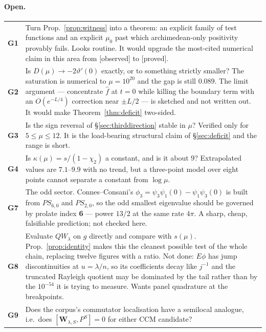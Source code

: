 \documentclass[11pt,a4paper]{article}
\theoremstyle{plain}
\theoremstyle{definition}
\theoremstyle{remark}
\newcommand{\st}[1]{{\normalfont\sffamily\footnotesize[#1]}}
\newcommand{\proved}{\st{proved}}
\newcommand{\observed}{\st{observed}}
\newcommand{\R}{\mathbb{R}}
\newcommand{\Z}{\mathbb{Z}}
\newcommand{\Q}{\mathbb{Q}}
\newcommand{\A}{\mathbb{A}}
\newcommand{\E}{\mathcal{E}}
\newcommand{\F}{\mathcal{F}}
\newcommand{\PS}{\mathit{PS}}
\newcommand{\QW}{QW}
\def\QW{QW}\def\E{E}\def\F{F}\def\R{R}\def\Q{Q}\def\Z{Z}\def\A{A}%
\begin{document}
\paragraph{Open.}

\begin{center}\small
\begin{tabular}{@{}lp{}@{}}
\hline
\textbf{G1} & Turn Prop.~\ref{prop:witness} into a theorem: an explicit family of
test functions and an explicit $\mu_0$ past which archimedean-only positivity
provably fails.  Looks routine.  It would upgrade the most-cited numerical claim
in this area from \observed{} to \proved. \\
\textbf{G2} & Is $D(\mu)\to-2\vartheta'(0)$ exactly, or to something strictly
smaller?  The saturation is numerical to $\mu=10^{20}$ and the gap is still
$0.089$.  The limit argument --- concentrate $\widehat f$ at $t=0$ while killing
the boundary term with an $O(e^{-L/4})$ correction near $\pm L/2$ --- is sketched
and not written out.  It would make Theorem~\ref{thm:deficit} two-sided. \\
\textbf{G3} & Is the sign reversal of \S\ref{sec:thirddirection} stable in $\mu$?
Verified only for $5\le\mu\le12$.  It is the load-bearing structural claim of
\S\ref{sec:deficit} and the range is short. \\
\textbf{G4} & Is $\kappa(\mu)=s/(1-\chi_2)$ a constant, and is it about $9$?
Extrapolated values are $7.1$--$9.9$ with no trend, but a three-point model over
eight points cannot separate a constant from $\log\mu$. \\
\textbf{G7} & The odd sector.  Connes--Consani's
$\phi_3=\psi_3\psi_1(0)-\psi_1\psi_3(0)$ is built from $\PS_{6,0}$ and
$\PS_{2,0}$, so the odd smallest eigenvalue should be governed by prolate index
\textbf{6} --- power $13/2$ at the same rate $4\pi$.  A sharp, cheap, falsifiable
prediction; not checked here. \\
\textbf{G8} & Evaluate $\QW_\lambda$ on $g$ directly and compare with $s(\mu)$.
Prop.~\ref{prop:identity} makes this the cleanest possible test of the whole
chain, replacing twelve figures with a ratio.  Not done: $\E\phi$ has jump
discontinuities at $u=\lambda/n$, so its coefficients decay like $j^{-1}$ and the
truncated Rayleigh quotient may be dominated by the tail rather than by the
$10^{-54}$ it is trying to measure.  Wants panel quadrature at the breakpoints. \\
\textbf{G9} & Does the corpus's commutator localisation have a semilocal
analogue, i.e.\ does $[\mathbf W_{\lambda,S},P^S]=0$ for either CCM candidate?

\end{tabular}
\end{center}
\end{document}
